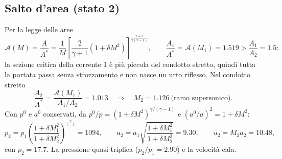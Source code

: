 \documentclass[11pt,a4paper]{article}
\newcommand{\Ar}{\mathcal{A}}
\begin{document}
\subsection{Salto d'area (stato 2)}
Per la legge delle aree
\[
  \Ar(M)=\frac{A}{A^*}=\frac1M\left[\frac{2}{\gamma+1}\left(1+\delta M^2\right)\right]^{\frac{\gamma+1}{2(\gamma-1)}},
  \qquad \frac{A_1}{A^*}=\Ar(M_1)=\num{1.519}>\frac{A_1}{A_2}=\num{1.5}:
\]
la sezione critica della corrente 1 è più piccola del condotto stretto, quindi tutta la portata passa senza
strozzamento e non nasce un urto riflesso. Nel condotto stretto
\[
  \frac{A_2}{A^*}=\frac{\Ar(M_1)}{A_1/A_2}=\num{1.013}\quad\Rightarrow\quad M_2=\num{1.126}\ \text{(ramo supersonico)}.
\]
Con $p^0$ e $a^0$ conservati, da $p^0/p=(1+\delta M^2)^{\gamma/(\gamma-1)}$ e $(a^0/a)^2=1+\delta M^2$:
\[
  p_2=p_1\left(\frac{1+\delta M_1^2}{1+\delta M_2^2}\right)^{\frac{\gamma}{\gamma-1}}=\num{1094},\qquad
  a_2=a_1\sqrt{\frac{1+\delta M_1^2}{1+\delta M_2^2}}=\num{9.30},\qquad u_2=M_2a_2=\num{10.48},
\]
con $\rho_2=\num{17.7}$. La pressione quasi triplica ($p_2/p_1=\num{2.90}$) e la velocità cala.
\end{document}
